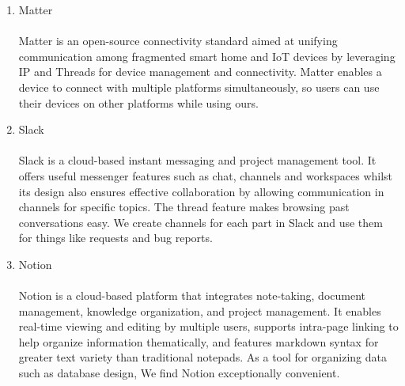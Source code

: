 \begin{enumerate}[label=\arabic*]
\begin{enumerate}[label=\alph*.]
              \item Matter\\
                    \\
                    Matter is an open-source connectivity standard aimed at unifying communication among fragmented smart home and IoT devices by leveraging IP and Threads for device management and connectivity. Matter enables a device to connect with multiple platforms simultaneously, so users can use their devices on other platforms while using ours.\\

              \item Slack\\
                    \\
                    Slack is a cloud-based instant messaging and project management tool. It offers useful messenger features such as chat, channels and workspaces whilst its design also ensures effective collaboration by allowing communication in channels for specific topics. The thread feature makes browsing past conversations easy. We create channels for each part in Slack and use them for things like requests and bug reports.\\

              \item Notion\\
                    \\
                    Notion is a cloud-based platform that integrates note-taking, document management, knowledge organization, and project management. It enables real-time viewing and editing by multiple users, supports intra-page linking to help organize information thematically, and features markdown syntax for greater text variety than traditional notepads. As a tool for organizing data such as database design, We find Notion exceptionally convenient.\\
          \end{enumerate}


\end{enumerate}
